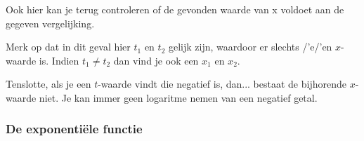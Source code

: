\begin{itemize}
Ook hier kan je terug controleren of de gevonden waarde van x voldoet
aan de gegeven vergelijking. 

Merk op dat in dit geval hier ${\displaystyle t_{1}}$ en ${\displaystyle t_{2}}$
gelijk zijn, waardoor er slechts /'e/'en $x$-waarde is. Indien ${\displaystyle t_{1}\neq{\displaystyle t_{2}}}$
dan vind je ook een ${\displaystyle x_{1}}$ en ${\displaystyle x_{2}}$.

Tenslotte, als je een $t$-waarde vindt die negatief is, dan... bestaat
de bijhorende $x$-waarde niet. Je kan immer geen logaritme nemen
van een negatief getal.

\end{itemize}


\subsubsection{De exponenti\"ele functie}

